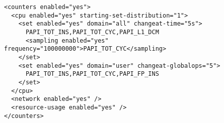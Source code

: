 \begin{verbatim}
<counters enabled="yes">
  <cpu enabled="yes" starting-set-distribution="1">
    <set enabled="yes" domain="all" changeat-time="5s">
      PAPI_TOT_INS,PAPI_TOT_CYC,PAPI_L1_DCM
      <sampling enabled="yes" frequency="100000000">PAPI_TOT_CYC</sampling>
    </set>
    <set enabled="yes" domain="user" changeat-globalops="5">
      PAPI_TOT_INS,PAPI_TOT_CYC,PAPI_FP_INS
    </set>
  </cpu>
  <network enabled="yes" />
  <resource-usage enabled="yes" />
</counters>
\end{verbatim}
